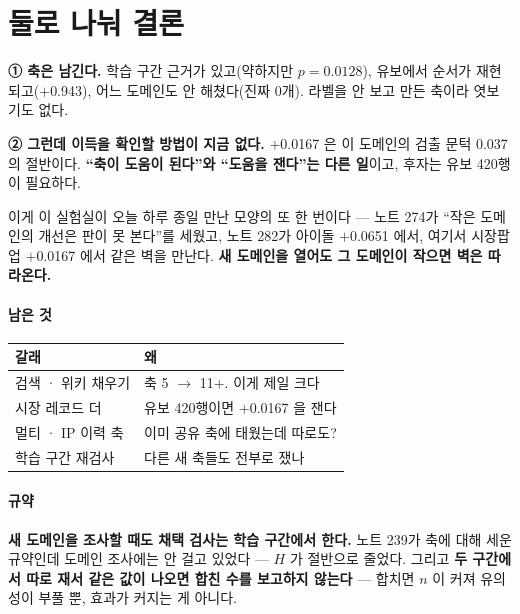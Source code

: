 \documentclass[10pt]{article}
\begin{document}
\section{둘로 나눠 결론}

\textbf{① 축은 남긴다.} 학습 구간 근거가 있고(약하지만 $p{=}0.0128$), 유보에서
순서가 재현되고($+$0.943), 어느 도메인도 안 해쳤다(진짜 0개). 라벨을 안 보고
만든 축이라 엿보기도 없다.

\textbf{② 그런데 이득을 확인할 방법이 지금 없다.} $+$0.0167 은 이 도메인의
검출 문턱 0.037 의 절반이다. \textbf{``축이 도움이 된다''와 ``도움을 잰다''는
다른 일}이고, 후자는 유보 420행이 필요하다.

이게 이 실험실이 오늘 하루 종일 만난 모양의 또 한 번이다 --- 노트 274가
``작은 도메인의 개선은 판이 못 본다''를 세웠고, 노트 282가 아이돌
$+$0.0651 에서, 여기서 시장팝업 $+$0.0167 에서 같은 벽을 만난다.
\textbf{새 도메인을 열어도 그 도메인이 작으면 벽은 따라온다.}

\paragraph{남은 것}
\begin{center}\small
\begin{tabular}{ll}
\hline
갈래 & 왜 \\
\hline
검색 · 위키 채우기 & 축 5 $\to$ 11$+$. 이게 제일 크다 \\
시장 레코드 더 & 유보 420행이면 $+$0.0167 을 잰다 \\
멀티 · IP 이력 축 & 이미 공유 축에 태웠는데 따로도? \\
학습 구간 재검사 & 다른 새 축들도 전부로 쟀나 \\
\hline
\end{tabular}
\end{center}

\paragraph{규약} \textbf{새 도메인을 조사할 때도 채택 검사는 학습 구간에서
한다.} 노트 239가 축에 대해 세운 규약인데 도메인 조사에는 안 걸고 있었다 ---
$H$ 가 절반으로 줄었다. 그리고 \textbf{두 구간에서 따로 재서 같은 값이 나오면
합친 수를 보고하지 않는다} --- 합치면 $n$ 이 커져 유의성이 부풀 뿐, 효과가
커지는 게 아니다.
\end{document}

